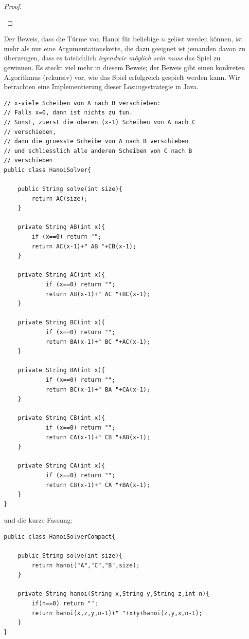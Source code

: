 \begin{bsp}
\begin{proof}
\begin{itemize}
\end{itemize}
\end{proof}
\begin{rk}
Der Beweis, dass die Türme von Hanoi für beliebige $n$ gelöst werden können, ist mehr als nur eine Argumentationskette, die dazu geeignet ist jemanden davon zu überzeugen, dass es tatsächlich \textit{irgendwie möglich sein muss} das Spiel zu gewinnen. Es steckt viel mehr in diesem Beweis; der Beweis gibt einen konkreten Algorithmus (rekursiv) vor, wie das Spiel erfolgreich gespielt werden kann. Wir betrachten eine Implementierung dieser Lösungsstrategie in Java.


\lstset{language=Java}
\begin{framed}
\begin{lstlisting}
// x-viele Scheiben von A nach B verschieben:
// Falls x=0, dann ist nichts zu tun.
// Sonst, zuerst die oberen (x-1) Scheiben von A nach C
// verschieben,
// dann die groesste Scheibe von A nach B verschieben
// und schliesslich alle anderen Scheiben von C nach B
// verschieben
public class HanoiSolver{

    public String solve(int size){
        return AC(size);
    }

    private String AB(int x){
        if (x==0) return "";
        return AC(x-1)+" AB "+CB(x-1);
    }

    private String AC(int x){
            if (x==0) return "";
            return AB(x-1)+" AC "+BC(x-1);
    }

    private String BC(int x){
            if (x==0) return "";
            return BA(x-1)+" BC "+AC(x-1);
    }

    private String BA(int x){
            if (x==0) return "";
            return BC(x-1)+" BA "+CA(x-1);
    }

    private String CB(int x){
            if (x==0) return "";
            return CA(x-1)+" CB "+AB(x-1);
    }

    private String CA(int x){
            if (x==0) return "";
            return CB(x-1)+" CA "+BA(x-1);
    }
}
\end{lstlisting}
\end{framed}
und die kurze Fassung:
\begin{framed}
\begin{lstlisting}
public class HanoiSolverCompact{

    public String solve(int size){
        return hanoi("A","C","B",size);
    }

    private String hanoi(String x,String y,String z,int n){
        if(n==0) return "";
        return hanoi(x,z,y,n-1)+" "+x+y+hanoi(z,y,x,n-1);
    }
}
\end{lstlisting}
\end{framed}


\end{rk}
\end{bsp}
